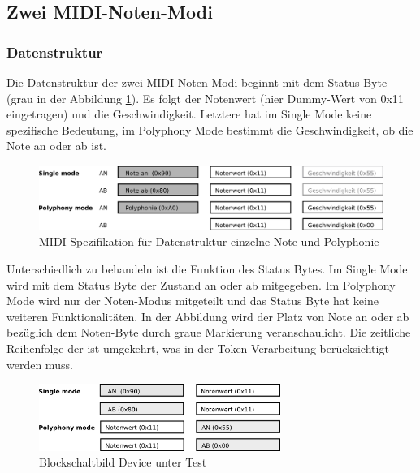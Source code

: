 \subsection{Zwei MIDI-Noten-Modi}\label{note_modes}

\subsubsection{Datenstruktur}

Die Datenstruktur der zwei MIDI-Noten-Modi beginnt mit dem Status Byte (grau in der Abbildung \ref{fig.testbench_single_Mode}). Es folgt der Notenwert (hier Dummy-Wert von 0x11 eingetragen) und die Geschwindigkeit. Letztere hat im Single Mode keine spezifische Bedeutung, im Polyphony Mode bestimmt die Geschwindigkeit, ob die Note an oder ab ist.

\begin{figure}[H]
	\includegraphics[width=1\textwidth]{images/midi_interface/MIDI_Spezifikation.png}
	\caption{MIDI Spezifikation für Datenstruktur einzelne Note und Polyphonie}
	\label{fig.testbench_single_Mode}
\end{figure}

Unterschiedlich zu behandeln ist die Funktion des Status Bytes. Im Single Mode wird mit dem Status Byte der Zustand an oder ab mitgegeben. Im Polyphony Mode wird nur der Noten-Modus mitgeteilt und das Status Byte hat keine weiteren Funktionalitäten. In der Abbildung wird der Platz von Note an oder ab bezüglich dem Noten-Byte durch graue Markierung veranschaulicht. Die zeitliche Reihenfolge der ist umgekehrt, was in der Token-Verarbeitung berücksichtigt werden muss.

\begin{figure}[H]
	\includegraphics[width=0.7\textwidth]{images/midi_interface/MIDI_Spezifikation_Datenfolge.png}
	\caption{Blockschaltbild Device unter Test}
	\label{fig.testbench_polypphon_mode}
\end{figure}

